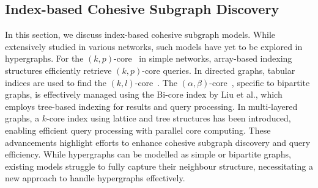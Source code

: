 

\subsection{Index-based Cohesive Subgraph Discovery} 
In this section, we discuss index-based cohesive subgraph models. While extensively studied in various networks, such models have yet to be explored in hypergraphs. For the $(k, p)$-core~\cite{zhang2020exploring} in simple networks, array-based indexing structures efficiently retrieve $(k, p)$-core queries. In directed graphs, tabular indices are used to find the $(k, l)$-core~\cite{fang2018effective}. The $(\alpha, \beta)$-core~\cite{ding2017efficient}, specific to bipartite graphs, is effectively managed using the Bi-core index by Liu et al.\cite{liu2019efficient}, which employs tree-based indexing for results and query processing. In multi-layered graphs, a $k$-core index using lattice and tree structures has been introduced\cite{liu2024fast}, enabling efficient query processing with parallel core computing. These advancements highlight efforts to enhance cohesive subgraph discovery and query efficiency. 
While hypergraphs can be modelled as simple or bipartite graphs, existing models struggle to fully capture their neighbour structure, necessitating a new approach to handle hypergraphs effectively.





